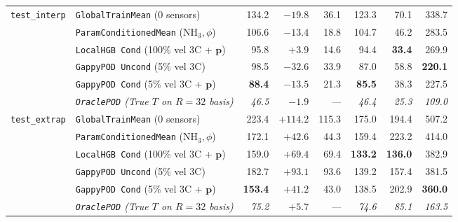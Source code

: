 \documentclass[11pt,letterpaper]{article}
\begin{document}
\begin{table}[H]
{\begin{tabular}{llrrrrrr}
\midrule
\texttt{test\_interp} & \texttt{GlobalTrainMean} (0 sensors) & 134.2 & $-19.8$ & 36.1 & 123.3 & 70.1 & 338.7 \\
 & \texttt{ParamConditionedMean} ($\text{NH}_3, \phi$) & 106.6 & $-13.4$ & 18.8 & 104.7 & 46.2 & 283.5 \\
 & \texttt{LocalHGB Cond} (100\% vel 3C + $\mathbf{p}$) & 95.8 & $+3.9$ & 14.6 & 94.4 & \textbf{33.4} & 269.9 \\
 & \texttt{GappyPOD Uncond} (5\% vel 3C) & 98.5 & $-32.6$ & 33.9 & 87.0 & 58.8 & \textbf{220.1} \\
 & \texttt{GappyPOD Cond} (5\% vel 3C + $\mathbf{p}$) & \textbf{88.4} & $-13.5$ & 21.3 & \textbf{85.5} & 38.3 & 227.5 \\
 & \textit{\texttt{OraclePOD} (True $T$ on $R=32$ basis)} & \textit{46.5} & \textit{$-1.9$} & \textit{---} & \textit{46.4} & \textit{25.3} & \textit{109.0} \\
\midrule
\texttt{test\_extrap} & \texttt{GlobalTrainMean} (0 sensors) & 223.4 & $+114.2$ & 115.3 & 175.0 & 194.4 & 507.2 \\
 & \texttt{ParamConditionedMean} ($\text{NH}_3, \phi$) & 172.1 & $+42.6$ & 44.3 & 159.4 & 223.2 & 414.0 \\
 & \texttt{LocalHGB Cond} (100\% vel 3C + $\mathbf{p}$) & 159.0 & $+69.4$ & 69.4 & \textbf{133.2} & \textbf{136.0} & 382.9 \\
 & \texttt{GappyPOD Uncond} (5\% vel 3C) & 182.7 & $+93.1$ & 93.6 & 139.2 & 157.4 & 381.5 \\
 & \texttt{GappyPOD Cond} (5\% vel 3C + $\mathbf{p}$) & \textbf{153.4} & $+41.2$ & 43.0 & 138.5 & 202.9 & \textbf{360.0} \\
 & \textit{\texttt{OraclePOD} (True $T$ on $R=32$ basis)} & \textit{75.2} & \textit{$+5.7$} & \textit{---} & \textit{74.6} & \textit{85.1} & \textit{163.5} \\
\bottomrule
\end{tabular}%
}
\end{table}
\end{document}
